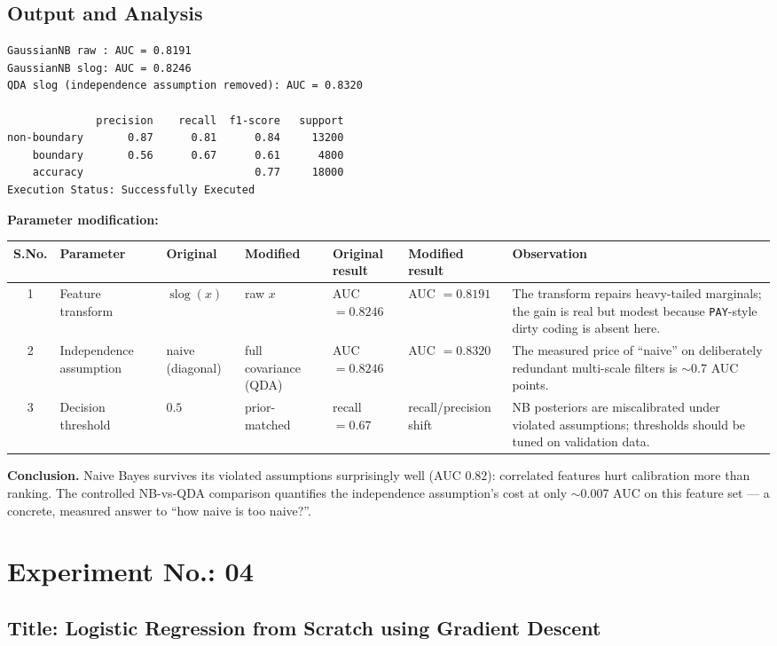 \documentclass[11pt,a4paper]{article}
\newcommand{\labsection}[1]{\subsection*{#1}}
\begin{document}
\labsection{Output and Analysis}
\begin{lstlisting}[style=output]
GaussianNB raw : AUC = 0.8191
GaussianNB slog: AUC = 0.8246
QDA slog (independence assumption removed): AUC = 0.8320

              precision    recall  f1-score   support
non-boundary       0.87      0.81      0.84     13200
    boundary       0.56      0.67      0.61      4800
    accuracy                           0.77     18000
Execution Status: Successfully Executed
\end{lstlisting}

\textbf{Parameter modification:}
\begin{center}\footnotesize
\begin{tabular}{@{}clllllp{3.4cm}@{}}
\toprule
S.No. & Parameter & Original & Modified & Original result & Modified result & Observation\\
\midrule
1 & Feature transform & $\operatorname{slog}(x)$ & raw $x$ & AUC $=0.8246$ & AUC $=0.8191$ & The transform repairs heavy-tailed marginals; the gain is real but modest because \texttt{PAY}-style dirty coding is absent here.\\
2 & Independence assumption & naive (diagonal) & full covariance (QDA) & AUC $=0.8246$ & AUC $=0.8320$ & The measured price of ``naive'' on deliberately redundant multi-scale filters is $\sim$0.7 AUC points.\\
3 & Decision threshold & $0.5$ & prior-matched & recall $=0.67$ & recall/precision shift & NB posteriors are miscalibrated under violated assumptions; thresholds should be tuned on validation data.\\
\bottomrule
\end{tabular}
\end{center}

\textbf{Conclusion.} Naive Bayes survives its violated assumptions surprisingly well (AUC $0.82$): correlated features hurt calibration more than ranking. The controlled NB-vs-QDA comparison quantifies the independence assumption's cost at only $\sim$0.007 AUC on this feature set --- a concrete, measured answer to ``how naive is too naive?''.

\newpage
\section*{Experiment No.: 04}
\labsection{Title: Logistic Regression from Scratch using Gradient Descent}
\end{document}
